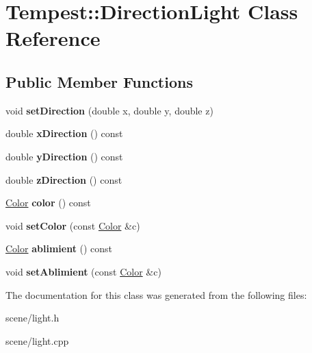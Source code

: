 \hypertarget{class_tempest_1_1_direction_light}{\section{Tempest\+:\+:Direction\+Light Class Reference}
\label{class_tempest_1_1_direction_light}
}
\subsection*{Public Member Functions}
\begin{DoxyCompactItemize}
\item 
\hypertarget{class_tempest_1_1_direction_light_a3eb050079048a405cbbe6bcea434553e}{void {\bfseries set\+Direction} (double x, double y, double z)}\label{class_tempest_1_1_direction_light_a3eb050079048a405cbbe6bcea434553e}

\item 
\hypertarget{class_tempest_1_1_direction_light_af25442e4e680b9554b322a0b41467f06}{double {\bfseries x\+Direction} () const }\label{class_tempest_1_1_direction_light_af25442e4e680b9554b322a0b41467f06}

\item 
\hypertarget{class_tempest_1_1_direction_light_ab4e7d77795b89a6bdff1b1fa392c31d5}{double {\bfseries y\+Direction} () const }\label{class_tempest_1_1_direction_light_ab4e7d77795b89a6bdff1b1fa392c31d5}

\item 
\hypertarget{class_tempest_1_1_direction_light_ad628518eda1424a1e331a374eaa789e4}{double {\bfseries z\+Direction} () const }\label{class_tempest_1_1_direction_light_ad628518eda1424a1e331a374eaa789e4}

\item 
\hypertarget{class_tempest_1_1_direction_light_a8065e01d338f3a28092cd0302c074bf4}{\hyperlink{class_tempest_1_1_color}{Color} {\bfseries color} () const }\label{class_tempest_1_1_direction_light_a8065e01d338f3a28092cd0302c074bf4}

\item 
\hypertarget{class_tempest_1_1_direction_light_a1aad4d140a1a973d78214148a1f10974}{void {\bfseries set\+Color} (const \hyperlink{class_tempest_1_1_color}{Color} \&c)}\label{class_tempest_1_1_direction_light_a1aad4d140a1a973d78214148a1f10974}

\item 
\hypertarget{class_tempest_1_1_direction_light_a092baf7f05d380d50c4dc335a028d143}{\hyperlink{class_tempest_1_1_color}{Color} {\bfseries ablimient} () const }\label{class_tempest_1_1_direction_light_a092baf7f05d380d50c4dc335a028d143}

\item 
\hypertarget{class_tempest_1_1_direction_light_a05b344b8c34165d2cf1fa5d0f260fe5f}{void {\bfseries set\+Ablimient} (const \hyperlink{class_tempest_1_1_color}{Color} \&c)}\label{class_tempest_1_1_direction_light_a05b344b8c34165d2cf1fa5d0f260fe5f}

\end{DoxyCompactItemize}


The documentation for this class was generated from the following files\+:\begin{DoxyCompactItemize}
\item 
scene/light.\+h\item 
scene/light.\+cpp\end{DoxyCompactItemize}
